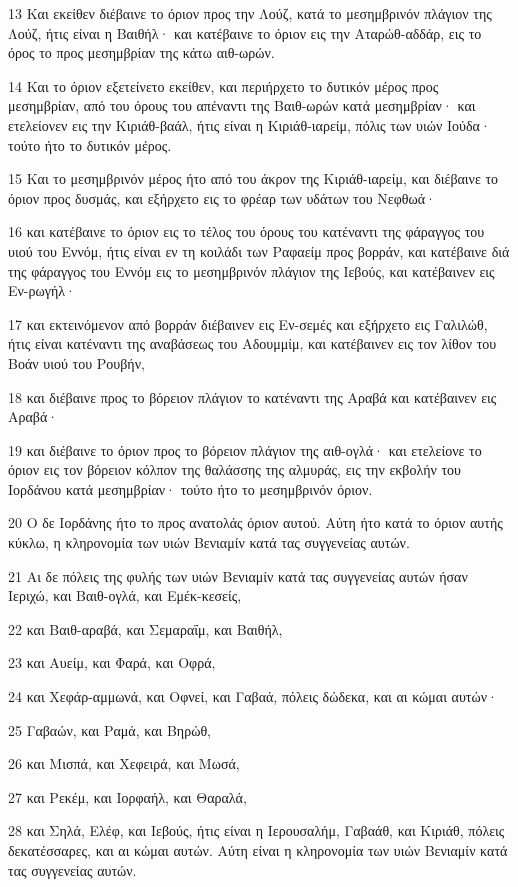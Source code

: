 \par 13 Και εκείθεν διέβαινε το όριον προς την Λούζ, κατά το μεσημβρινόν πλάγιον της Λούζ, ήτις είναι η Βαιθήλ· και κατέβαινε το όριον εις την Αταρώθ-αδδάρ, εις το όρος το προς μεσημβρίαν της κάτω αιθ-ωρών.
\par 14 Και το όριον εξετείνετο εκείθεν, και περιήρχετο το δυτικόν μέρος προς μεσημβρίαν, από του όρους του απέναντι της Βαιθ-ωρών κατά μεσημβρίαν· και ετελείονεν εις την Κιριάθ-βαάλ, ήτις είναι η Κιριάθ-ιαρείμ, πόλις των υιών Ιούδα· τούτο ήτο το δυτικόν μέρος.
\par 15 Και το μεσημβρινόν μέρος ήτο από του άκρον της Κιριάθ-ιαρείμ, και διέβαινε το όριον προς δυσμάς, και εξήρχετο εις το φρέαρ των υδάτων του Νεφθωά·
\par 16 και κατέβαινε το όριον εις το τέλος του όρους του κατέναντι της φάραγγος του υιού του Εννόμ, ήτις είναι εν τη κοιλάδι των Ραφαείμ προς βορράν, και κατέβαινε διά της φάραγγος του Εννόμ εις το μεσημβρινόν πλάγιον της Ιεβούς, και κατέβαινεν εις Εν-ρωγήλ·
\par 17 και εκτεινόμενον από βορράν διέβαινεν εις Εν-σεμές και εξήρχετο εις Γαλιλώθ, ήτις είναι κατέναντι της αναβάσεως του Αδουμμίμ, και κατέβαινεν εις τον λίθον του Βοάν υιού του Ρουβήν,
\par 18 και διέβαινε προς το βόρειον πλάγιον το κατέναντι της Αραβά και κατέβαινεν εις Αραβά·
\par 19 και διέβαινε το όριον προς το βόρειον πλάγιον της αιθ-ογλά· και ετελείονε το όριον εις τον βόρειον κόλπον της θαλάσσης της αλμυράς, εις την εκβολήν του Ιορδάνου κατά μεσημβρίαν· τούτο ήτο το μεσημβρινόν όριον.
\par 20 Ο δε Ιορδάνης ήτο το προς ανατολάς όριον αυτού. Αύτη ήτο κατά το όριον αυτής κύκλω, η κληρονομία των υιών Βενιαμίν κατά τας συγγενείας αυτών.
\par 21 Αι δε πόλεις της φυλής των υιών Βενιαμίν κατά τας συγγενείας αυτών ήσαν Ιεριχώ, και Βαιθ-ογλά, και Εμέκ-κεσείς,
\par 22 και Βαιθ-αραβά, και Σεμαραΐμ, και Βαιθήλ,
\par 23 και Αυείμ, και Φαρά, και Οφρά,
\par 24 και Χεφάρ-αμμωνά, και Οφνεί, και Γαβαά, πόλεις δώδεκα, και αι κώμαι αυτών·
\par 25 Γαβαών, και Ραμά, και Βηρώθ,
\par 26 και Μισπά, και Χεφειρά, και Μωσά,
\par 27 και Ρεκέμ, και Ιορφαήλ, και Θαραλά,
\par 28 και Σηλά, Ελέφ, και Ιεβούς, ήτις είναι η Ιερουσαλήμ, Γαβαάθ, και Κιριάθ, πόλεις δεκατέσσαρες, και αι κώμαι αυτών. Αύτη είναι η κληρονομία των υιών Βενιαμίν κατά τας συγγενείας αυτών.

